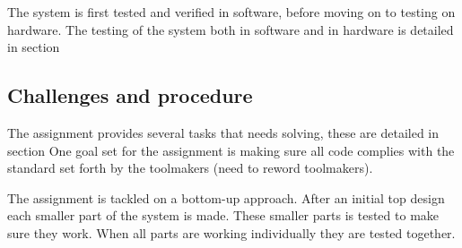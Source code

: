 The system is first tested and verified in software, before moving on to testing on hardware.
The testing of the system both in software and in hardware is detailed in section%

\subsection{Challenges and procedure}

The assignment provides several tasks that needs solving, these are detailed in section%
One goal set for the assignment is making sure all code complies with the standard set forth by the toolmakers (need to reword toolmakers).

The assignment is tackled on a bottom-up approach.
After an initial top design each smaller part of the system is made.
These smaller parts is tested to make sure they work.
When all parts are working individually they are tested together.

